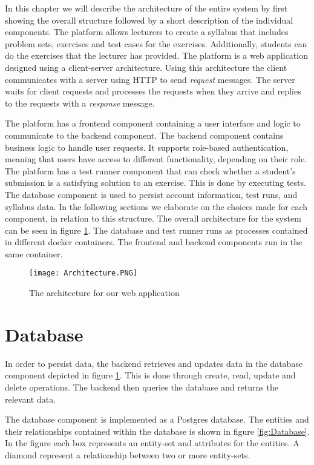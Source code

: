 In this chapter we will describe the architecture of the entire system by first showing the overall structure followed by a short description of the individual components.
The platform allows lecturers to create a syllabus that includes problem sets, exercises and test cases for the exercises. Additionally, students can do the exercises that the lecturer has provided.
The platform is a web application designed using a client-server architecture. Using this architecture the client communicates with a server using HTTP to send \textit{request} messages. The server waits for client requests and processes the requests when they arrive and replies to the requests with a \textit{response} message.

The platform has a frontend component containing a user interface and logic to communicate to the backend component. 
The backend component contains business logic to handle user requests. 
It supports role-based authentication, meaning that users have access to different functionality, depending on their role. 
The platform has a test runner component that can check whether a student's submission is a satisfying solution to an exercise. 
This is done by executing tests. The database component is used to persist account information, test runs, and syllabus data.
In the following sections we elaborate on the choices made for each component, in relation to this structure.
The overall architecture for the system can be seen in figure \ref{fig:Architecture}.
The database and test runner runs as processes contained in different docker containers. The frontend and backend components run in the same container.

\begin{figure}[H]
	\texttt{[image: Architecture.PNG]}
	\centering
	\caption{The architecture for our web application}
	\label{fig:Architecture}
\end{figure}


\section{Database}
In order to persist data, the backend retrieves and updates data in the database component depicted in figure \ref{fig:Architecture}. This is done through create, read, update and delete operations.
The backend then queries the database and returns the relevant data.

The database component is implemented as a Postgres database. The entities and their relationships contained within the database is shown in figure \ref{fig:Database}. In the figure each box represents an entity-set and attributes for the entities. A diamond represent a relationship between two or more entity-sets.


